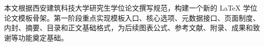 \begin{abstractcn}
本文根据西安建筑科技大学研究生学位论文撰写规范，构建一个新的 LaTeX 学位论文模板骨架。第一阶段重点实现模板入口、核心选项、元数据接口、页面制度、内封、摘要、目录和正文基础格式，为后续图表公式、参考文献、附录、成果和致谢等功能奠定基础。
\end{abstractcn}
